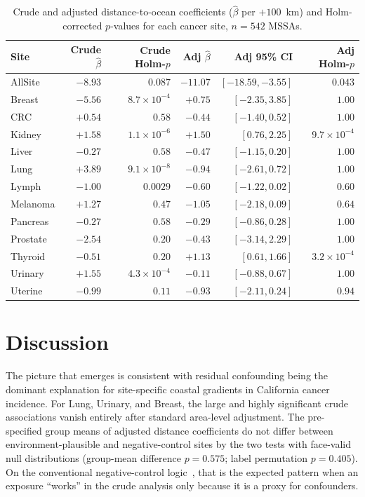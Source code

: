 \documentclass[11pt]{article}
\begin{document}
\begin{table}[t]\small
\centering
\caption{Crude and adjusted distance-to-ocean coefficients ($\hat\beta$ per $+100$~km) and Holm-corrected $p$-values for each cancer site, $n=542$ MSSAs.}
\label{tab:e1}
\begin{tabular}{lrrrrr}
\toprule
Site & Crude $\hat\beta$ & Crude Holm-$p$ & Adj $\hat\beta$ & Adj 95\% CI & Adj Holm-$p$ \\
\midrule
AllSite & $-8.93$ & $0.087$ & $-11.07$ & $[-18.59,-3.55]$ & $0.043$ \\
Breast & $-5.56$ & $8.7\!\times\!10^{-4}$ & $+0.75$ & $[-2.35,3.85]$ & $1.00$ \\
CRC & $+0.54$ & $0.58$ & $-0.44$ & $[-1.40,0.52]$ & $1.00$ \\
Kidney & $+1.58$ & $1.1\!\times\!10^{-6}$ & $+1.50$ & $[0.76,2.25]$ & $9.7\!\times\!10^{-4}$ \\
Liver & $-0.27$ & $0.58$ & $-0.47$ & $[-1.15,0.20]$ & $1.00$ \\
Lung & $+3.89$ & $9.1\!\times\!10^{-8}$ & $-0.94$ & $[-2.61,0.72]$ & $1.00$ \\
Lymph & $-1.00$ & $0.0029$ & $-0.60$ & $[-1.22,0.02]$ & $0.60$ \\
Melanoma & $+1.27$ & $0.47$ & $-1.05$ & $[-2.18,0.09]$ & $0.64$ \\
Pancreas & $-0.27$ & $0.58$ & $-0.29$ & $[-0.86,0.28]$ & $1.00$ \\
Prostate & $-2.54$ & $0.20$ & $-0.43$ & $[-3.14,2.29]$ & $1.00$ \\
Thyroid & $-0.51$ & $0.20$ & $+1.13$ & $[0.61,1.66]$ & $3.2\!\times\!10^{-4}$ \\
Urinary & $+1.55$ & $4.3\!\times\!10^{-4}$ & $-0.11$ & $[-0.88,0.67]$ & $1.00$ \\
Uterine & $-0.99$ & $0.11$ & $-0.93$ & $[-2.11,0.24]$ & $0.94$ \\
\bottomrule
\end{tabular}
\end{table}

\section{Discussion}
The picture that emerges is consistent with residual confounding being the dominant explanation for site-specific coastal gradients in California cancer incidence. For Lung, Urinary, and Breast, the large and highly significant crude associations vanish entirely after standard area-level adjustment. The pre-specified group means of adjusted distance coefficients do not differ between environment-plausible and negative-control sites by the two tests with face-valid null distributions (group-mean difference $p=0.575$; label permutation $p=0.405$). On the conventional negative-control logic~\citep{Lipsitch2010NegativeControls}, that is the expected pattern when an exposure ``works'' in the crude analysis only because it is a proxy for confounders.
\end{document}
